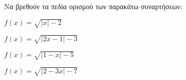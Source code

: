 Να βρεθούν τα πεδία ορισμού των παρακάτω συναρτήσεων:
\begin{alist}
\item $ f(x)=\sqrt{|x|-2} $
\item $ f(x)=\sqrt{|2x-1|-3} $
\item $ f(x)=\sqrt{|1-x|-5} $
\item $ f(x)=\sqrt{|2-3x|-7} $
\end{alist}
